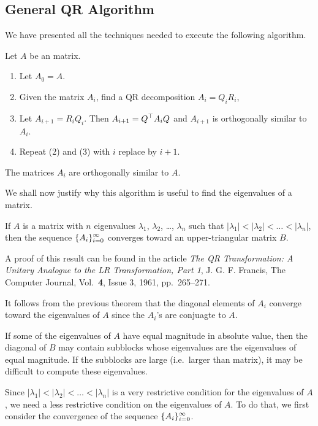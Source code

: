 \subsection{General QR Algorithm}

We have presented all the techniques needed to execute the following
algorithm.

\begin{algo}[QR Algorithm]
Let $A$ be an \nn matrix.
\begin{enumerate}
\item Let $A_0 = A$.
\item Given the \nn matrix $A_i$, find a QR decomposition $A_i = Q_i R_i$,
\item Let $A_{i+1} = R_i Q_i$.  Then $\displaystyle A_{i+1} = Q^\top A_i Q$ and
$A_{i+1}$ is orthogonally similar to $A_i$.
\item Repeat (2) and (3) with $i$ replace by $i+1$.
\end{enumerate}
The matrices $A_i$ are orthogonally similar to $A$.
\end{algo}

We shall now justify why this algorithm is useful to find the
eigenvalues of a matrix.

\begin{theorem}[Francis]
If $A$ is a \nn matrix with $n$ eigenvalues $\lambda_1$, $\lambda_2$,
\ldots, $\lambda_n$ such that $|\lambda_1|<|\lambda_2|<\ldots <|\lambda_n|$,
then the sequence $\displaystyle \{ A_i\}_{i=0}^\infty$ converges
toward an upper-triangular matrix $B$.
\end{theorem}

A proof of this result can be found in the article
{\it The QR Transformation: A Unitary Analogue to the LR
  Transformation, Part 1}, J. G. F. Francis, The Computer Journal,
Vol.\ {\bfseries 4}, Issue 3, 1961, pp.\ 265–271.

It follows from the previous theorem that the diagonal elements of
$A_i$ converge toward the eigenvalues of $A$ since the $A_i$'s are
conjuagte to $A$.

If some of the eigenvalues of $A$ have equal magnitude in absolute value,
then the diagonal of $B$ may contain subblocks whose eigenvalues are
the eigenvalues of equal magnitude.   If the subblocks are large
(i.e.\ larger than  matrix), it may be difficult to compute
these eigenvalues.

Since $|\lambda_1|<|\lambda_2|<\ldots <|\lambda_n|$ is a very
restrictive condition for the eigenvalues of $A$, we need a less
restrictive condition on the eigenvalues of $A$.  To do that, we first
consider the convergence of the sequence
$\displaystyle \{ A_i\}_{i=0}^\infty$.

